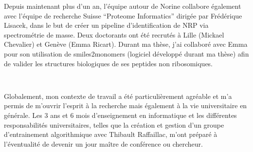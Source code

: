 Depuis maintenant plus d'un an, l'équipe autour de Norine collabore également avec l'équipe de recherche Suisse ``Proteome Informatics'' dirigée par Frédérique Lisacek, dans le but de créer un pipeline d'identification de NRP via spectrométrie de masse.
Deux doctorants ont été recrutés à Lille (Mickael Chevalier) et Genève (Emma Ricart).
Durant ma thèse, j'ai collaboré avec Emma pour son utilisation de smiles2monomers (logiciel développé durant ma thèse) afin de valider les structures biologiques de ses peptides non ribosomiques.

~~

Globalement, mon contexte de travail a été particulièrement agréable et m'a permis de m'ouvrir l'esprit à la recherche mais également à la vie universitaire en générale.
Les 3 ans et 6 mois d'enseignement en informatique et les différentes responsabilités universitaires, telles que la création et gestion d'un groupe d'entrainement algorithmique avec Thibault Raffaillac, m'ont préparé à l'éventualité de devenir un jour maître de conférence ou chercheur.



























